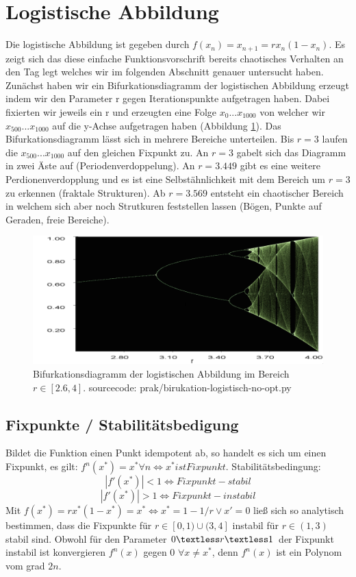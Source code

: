 \documentclass{scrartcl}
\begin{document}
\tableofcontents

\section{Logistische Abbildung}
Die logistische Abbildung ist gegeben durch $f(x_n)=x_{n+1}=rx_n(1-x_n)$. Es zeigt sich das diese einfache Funktionsvorschrift 
bereits chaotisches Verhalten an den Tag legt welches wir im folgenden Abschnitt genauer untersucht haben. Zunächst haben 
wir ein Bifurkationsdiagramm der logistischen Abbildung erzeugt indem wir den Parameter r gegen Iterationspunkte aufgetragen haben. Dabei fixierten wir jeweils ein r und erzeugten eine Folge $x_0 ... x_{1000}$ von welcher wir $x_{500} ... x_{1000}$ auf die y-Achse aufgetragen haben (Abbildung \ref{fig:bifurkation-sin-nice}).
Das Bifurkationsdiagramm lässt sich in mehrere Bereiche unterteilen. Bis $r=3$ laufen die $x_{500}...x_{1000}$ auf den gleichen Fixpunkt zu. An $r=3$ gabelt sich das Diagramm in zwei Äste auf (Periodenverdoppelung). An $r=3.449$ gibt es eine weitere Perdionenverdopplung und es ist eine Selbstähnlichkeit mit dem Bereich um $r=3$ zu erkennen (fraktale Strukturen). Ab $r=3.569$ entsteht ein chaotischer Bereich in welchem sich aber noch Strutkuren feststellen lassen (Bögen, Punkte auf Geraden, freie Bereiche).
\begin{figure}
	\centering
	\includegraphics[scale=0.30]{bifurkation}
	\caption{Bifurkationsdiagramm der logistischen Abbildung im Bereich $r\in[2.6,4]$. sourcecode: prak/birukation-logistisch-no-opt.py}
	\label{fig:bifurkation-sin-nice}
\end{figure}
\subsection{Fixpunkte / Stabilitätsbedigung}
Bildet die Funktion einen Punkt idempotent ab, so handelt es sich um einen Fixpunkt, es gilt: $f^n(x^*)=x^* \forall n \iff x^* ist Fixpunkt$. 
Stabilitätsbedingung:
$$|f'(x^*)|<1 \iff Fixpunkt-stabil$$
$$|f'(x^*)|>1 \iff Fixpunkt-instabil$$ Mit
\begin{math}
f(x^*)=rx^*(1-x^*)=x^*
\iff x^*=1-1/r \vee x'=0
\end{math}
ließ sich so analytisch bestimmen, dass die Fixpunkte für $r \in [0,1) \cup (3,4]$ instabil für $r \in (1,3)$ stabil sind.
Obwohl für den Parameter $0 \textless r \textless 1$ der Fixpunkt instabil ist konvergieren $f^n(x)$ gegen 0 $\forall x \neq x^*$, denn $f^n(x)$ ist ein Polynom vom grad $2n$. 
\end{document}
